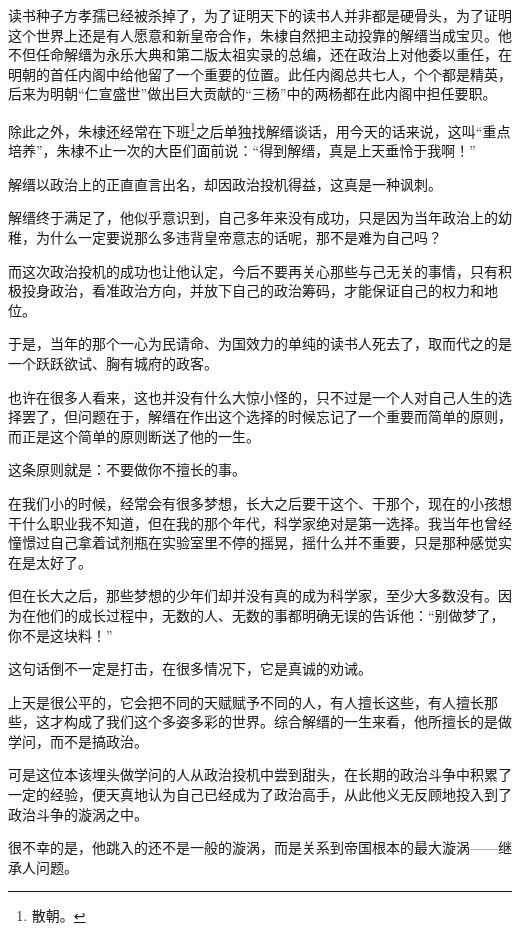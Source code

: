 \begin{multicols}{\theparacolNo}
读书种子方孝孺已经被杀掉了，为了证明天下的读书人并非都是硬骨头，为了证明这个世界上还是有人愿意和新皇帝合作，朱棣自然把主动投靠的解缙当成宝贝。他不但任命解缙为永乐大典和第二版太祖实录的总编，还在政治上对他委以重任，在明朝的首任内阁中给他留了一个重要的位置。此任内阁总共七人，个个都是精英，后来为明朝“仁宣盛世”做出巨大贡献的“三杨”中的两杨都在此内阁中担任要职。

除此之外，朱棣还经常在下班\footnote{散朝。}之后单独找解缙谈话，用今天的话来说，这叫“重点培养”，朱棣不止一次的大臣们面前说：“得到解缙，真是上天垂怜于我啊！”

解缙以政治上的正直直言出名，却因政治投机得益，这真是一种讽刺。

解缙终于满足了，他似乎意识到，自己多年来没有成功，只是因为当年政治上的幼稚，为什么一定要说那么多违背皇帝意志的话呢，那不是难为自己吗？

而这次政治投机的成功也让他认定，今后不要再关心那些与己无关的事情，只有积极投身政治，看准政治方向，并放下自己的政治筹码，才能保证自己的权力和地位。

于是，当年的那个一心为民请命、为国效力的单纯的读书人死去了，取而代之的是一个跃跃欲试、胸有城府的政客。

也许在很多人看来，这也并没有什么大惊小怪的，只不过是一个人对自己人生的选择罢了，但问题在于，解缙在作出这个选择的时候忘记了一个重要而简单的原则，而正是这个简单的原则断送了他的一生。

这条原则就是：不要做你不擅长的事。

在我们小的时候，经常会有很多梦想，长大之后要干这个、干那个，现在的小孩想干什么职业我不知道，但在我的那个年代，科学家绝对是第一选择。我当年也曾经憧憬过自己拿着试剂瓶在实验室里不停的摇晃，摇什么并不重要，只是那种感觉实在是太好了。

但在长大之后，那些梦想的少年们却并没有真的成为科学家，至少大多数没有。因为在他们的成长过程中，无数的人、无数的事都明确无误的告诉他：“别做梦了，你不是这块料！”

这句话倒不一定是打击，在很多情况下，它是真诚的劝诫。

上天是很公平的，它会把不同的天赋赋予不同的人，有人擅长这些，有人擅长那些，这才构成了我们这个多姿多彩的世界。综合解缙的一生来看，他所擅长的是做学问，而不是搞政治。

可是这位本该埋头做学问的人从政治投机中尝到甜头，在长期的政治斗争中积累了一定的经验，便天真地认为自己已经成为了政治高手，从此他义无反顾地投入到了政治斗争的漩涡之中。

很不幸的是，他跳入的还不是一般的漩涡，而是关系到帝国根本的最大漩涡——继承人问题。


\end{multicols}
